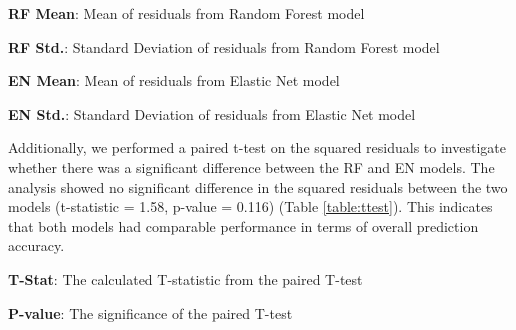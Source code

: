 \documentclass[11pt]{article}
\begin{document}
\begin{table}[h]
\caption{Summary of residuals from the Random Forest and Elastic Net models (Transposed)}
\label{table:summary_of_residuals}
\begin{threeparttable}
\renewcommand{\TPTminimum}{\linewidth}
\begin{tablenotes}
\footnotesize
\item \textbf{RF Mean}: Mean of residuals from Random Forest model
\item \textbf{RF Std.}: Standard Deviation of residuals from Random Forest model
\item \textbf{EN Mean}: Mean of residuals from Elastic Net model
\item \textbf{EN Std.}: Standard Deviation of residuals from Elastic Net model
\end{tablenotes}
\end{threeparttable}
\end{table}


Additionally, we performed a paired t-test on the squared residuals to investigate whether there was a significant difference between the RF and EN models. The analysis showed no significant difference in the squared residuals between the two models (t-statistic = 1.58, p-value = 0.116) (Table \ref{table:ttest}). This indicates that both models had comparable performance in terms of overall prediction accuracy.

\begin{table}[h]
\caption{T-test results for Random Forest and Elastic Net models}
\label{table:ttest}
\begin{threeparttable}
\renewcommand{\TPTminimum}{\linewidth}
\begin{tablenotes}
\footnotesize
\item \textbf{T-Stat}: The calculated T-statistic from the paired T-test
\item \textbf{P-value}: The significance of the paired T-test
\end{tablenotes}
\end{threeparttable}
\end{table}
\end{document}
